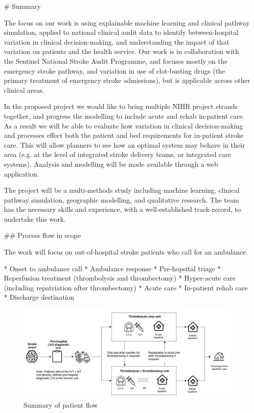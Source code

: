 \begin{markdown}
# Summary

The focus on our work is using explainable machine learning and clinical pathway simulation, applied to national clinical audit data to identify between-hospital variation in clinical decision-making, and understanding the impact of that variation on patients and the health service. Our work is in collaboration with the Sentinel National Stroke Audit Programme, and focuses mostly on the emergency stroke pathway, and variation in use of clot-busting drugs (the primary treatment of emergency stroke admissions), but is applicable across other clinical areas.

In the proposed project we would like to bring multiple NIHR project strands together, and progress the modelling to include acute and rehab in-patient care. As a result we will be able to evaluate how variation in clinical decision-making and processes effect both the patient and bed requirements for in-patient stroke care. This will allow planners to see how an optimal system may behave in their area (e.g. at the level of integrated stroke delivery teams, or integrated care systems). Analysis and modelling will be made available through a web application.

The project will be a multi-methods study including machine learning, clinical pathway simulation, geographic modelling, and qualitative research. The team has the necessary skills and experience, with a well-established track-record, to undertake this work.

## Process flow in scope

The work will focus on out-of-hospital stroke patients who call for an ambulance.

* Onset to ambulance call
* Ambulance response
* Pre-hopsital triage
* Reperfusion treatment (thrombolysis and thrombectomy)
* Hyper-acute care (including repatriation after thrombectomy)
* Acute care
* In-patient rehab care
* Discharge destination
\end{markdown}

\begin{figure}
\centering
\includegraphics[width=1.0\textwidth]{./images/pathway}
\caption{Summary of patient flow}
\label{fig:flow}
\end{figure}

